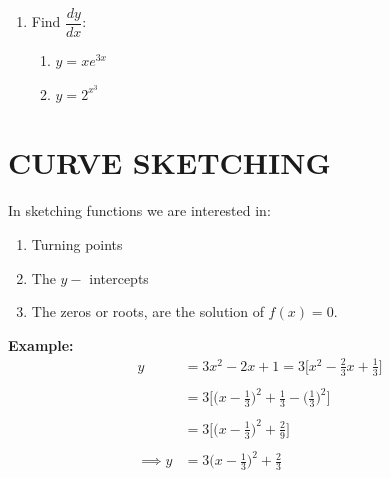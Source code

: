 \documentclass[11pt,a4paper]{article}
\begin{document}
\begin{enumerate}
\begin{enumerate}
      \item $y=\dfrac{e^{\displaystyle {x\cos (x^2+2)}}}{(x-2)^2}$\\
\end{enumerate}

\item Find $\dfrac{dy}{dx}$:
\begin{enumerate}
     \item $y=xe^{\displaystyle {3x}}$\\
     
     \item $y=2^{\displaystyle {x^3}}$\\
\end{enumerate}
\end{enumerate}





























\pagebreak
\section{CURVE SKETCHING}
In sketching functions we are interested in:
\begin{enumerate}
\item Turning points
\item The $y-$ intercepts
\item The zeros or roots, are the solution of $f(x)=0$.\\
\end{enumerate}


\textbf{Example:}
\begin{align*}
y & = 3x^2-2x+1
   = 3\bigg[x^2-\frac{2}{3}x+\frac{1}{3}\bigg]\\\\
  & = 3\bigg[\bigg(x-\frac{1}{3}\bigg)^2+\frac{1}{3}-\bigg(\frac{1}{3}\bigg)^2\bigg]\\\\
  & = 3\bigg[\bigg(x-\frac{1}{3}\bigg)^2+\frac{2}{9}\bigg]\\\\
\implies y  & = 3\bigg(x-\frac{1}{3}\bigg)^2+\frac{2}{3}\\
\end{align*}
\end{document}
